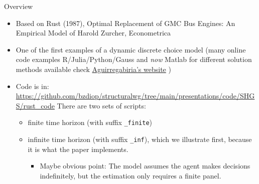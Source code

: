 \documentclass[aspectratio=169]{beamer}
\begin{document}
	\begin{frame}{Overview}
		\begin{itemize}
			\itemsep1em
			\item Based on Rust (1987), Optimal Replacement of GMC Bus Engines: An Empirical Model of Harold Zurcher, Econometrica
			\item One of the first examples of a dynamic discrete choice model (many online code examples R/Julia/Python/Gauss and \textit{now} Matlab for different solution methods available \textemdash 
			check \href{https://sites.google.com/view/victoraguirregabiriaswebsite/computer-code\#h.7dcyjeogndqb}{Aguirregabiria's website} )
			\item     Code is in:\\
			\url{https://github.com/bzdiop/structuralwg/tree/main/presentations/code/SHGS/rust_code}
			There are two sets of scripts:
			\begin{itemize}
				
				\item finite time horizon (with suffix \texttt{\_finite}) 
				\item infinite time horizon (with suffix \texttt{\_inf}), which we illustrate first, because it is what the paper implements.
				\begin{itemize}
					\item Maybe obvious point: The model assumes the agent makes decisions indefinitely, but the estimation only requires a finite panel.
				\end{itemize}
			\end{itemize}
		\end{itemize}
		
	\end{frame}
	
\end{document}
